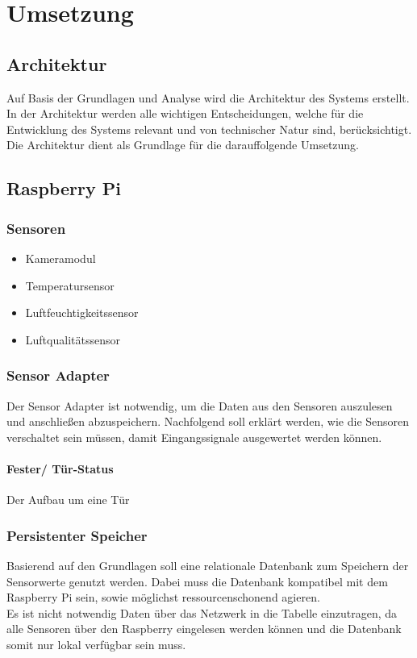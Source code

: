 \chapter{Umsetzung} \label{sec:Umsetzung}

\section{Architektur}
Auf Basis der Grundlagen und Analyse wird die Architektur des Systems erstellt.
In der Architektur werden alle wichtigen Entscheidungen, welche für die
Entwicklung des Systems relevant und von technischer Natur sind, berücksichtigt. Die Architektur dient als Grundlage für die darauffolgende Umsetzung.

\section{Raspberry Pi}

\subsection{Sensoren}
\begin{itemize}
	\item Kameramodul
	\item Temperatursensor
	\item Luftfeuchtigkeitssensor
	\item Luftqualitätssensor 
\end{itemize}


\subsection{Sensor Adapter}
Der Sensor Adapter ist notwendig, um die Daten aus den Sensoren auszulesen und anschließen abzuspeichern. Nachfolgend soll erklärt werden, wie die Sensoren verschaltet sein müssen, damit Eingangssignale ausgewertet werden können. 

\subsubsection{Fester/ Tür-Status}
Der Aufbau um eine Tür 

\subsection{Persistenter Speicher}
Basierend auf den Grundlagen soll eine relationale Datenbank zum Speichern der Sensorwerte genutzt werden. Dabei muss die Datenbank kompatibel mit dem Raspberry Pi sein, sowie möglichst ressourcenschonend agieren. \\Es ist nicht notwendig Daten über das Netzwerk in die Tabelle einzutragen, da alle Sensoren über den Raspberry eingelesen werden können und die Datenbank somit nur lokal verfügbar sein muss.  

